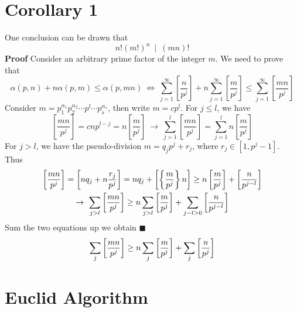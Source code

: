 \documentclass[11pt]{article}
\begin{document}
\section{Corollary 1}
One conclusion can be drawn that
\begin{equation}
    n!(m!)^n~\mid~(mn)!
\end{equation}
\textbf{Proof}
Consider an arbitrary prime factor of the integer $m$. We need to prove that
\begin{equation}
    \alpha(p,n) + n\alpha(p,m) \leq \alpha(p,mn)~\Leftrightarrow~\sum_{j=1}^{\infty}\left[ \frac{n}{p^j}\right] + n \sum_{j=1}^{\infty}\left[ \frac{m}{p^j} \right] \leq \sum_{j=1}^{\infty}\left[ \frac{mn}{p^j}\right]
\end{equation}
Consider $m = p_1^{\alpha_1}p_2^{\alpha_2}\cdots p^{l} \cdots p_s^{\alpha_s}$, then write $m = cp^l$. For $j \leq l$, we have
\begin{equation}
    \left[\frac{mn}{p^j} \right] = cnp^{l-j} = n\left[\frac{m}{p^j}\right]~\rightarrow~\sum_{j=1}^{l} \left[\frac{mn}{p^j} \right] = \sum_{j=1}^l n\left[\frac{m}{p^j}\right]
\end{equation}
For $j > l$, we have the pseudo-division $m = q_jp^{j} + r_j$, where $r_j \in [1, p^{j}-1]$. Thus
\begin{gather}
    \left[\frac{mn}{p^j}\right] = \left[ nq_j + n\frac{r_j}{p^j}\right] = nq_j + \left[\left\{\frac{m}{p^j}\right\}n\right] \geq n\left[\frac{m}{p^j}\right] + \left[ \frac{n}{p^{j-l}}\right]  \notag \\
    \rightarrow~\sum_{j>l} \left[\frac{mn}{p^j}\right] \geq n\sum_{j>l}\left[\frac{m}{p^j}\right] + \sum_{j-l > 0}\left[\frac{n}{p^{j-l}}\right]
\end{gather}
Sum the two equations up we obtain \hfill $\blacksquare$
\begin{equation}
    \sum_j \left[\frac{mn}{p^j}\right] \geq n\sum_{j}\left[\frac{m}{p^j}\right] + \sum_{j} \left[\frac{n}{p^{j}}\right] \notag
\end{equation}
\section{Euclid Algorithm}
\end{document}
